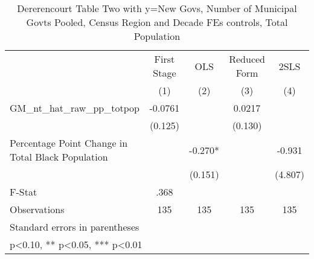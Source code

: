 \begin{table}[htbp]\centering
\def\sym#1{\ifmmode^{#1}\else\(^{#1}\)\fi}
\caption{Dererencourt Table Two with y=New Govs, Number of Municipal Govts  Pooled, Census Region and Decade FEs controls, Total Population}
\begin{tabular}{l*{4}{c}}
\toprule
                    & First Stage   &         OLS   &Reduced Form   &        2SLS   \\
                    &\multicolumn{1}{c}{(1)}   &\multicolumn{1}{c}{(2)}   &\multicolumn{1}{c}{(3)}   &\multicolumn{1}{c}{(4)}   \\
\midrule
GM\_nt\_hat\_raw\_pp\_totpop&     -0.0761   &               &      0.0217   &               \\
                    &     (0.125)   &               &     (0.130)   &               \\
\addlinespace
Percentage Point Change in Total Black Population&               &      -0.270*  &               &      -0.931   \\
                    &               &     (0.151)   &               &     (4.807)   \\
\midrule
F-Stat              &        .368   &               &               &               \\
Observations        &         135   &         135   &         135   &         135   \\
\bottomrule
\multicolumn{5}{l}{\footnotesize Standard errors in parentheses}\\
\multicolumn{5}{l}{\footnotesize * p<0.10, ** p<0.05, *** p<0.01}\\
\end{tabular}
\end{table}
